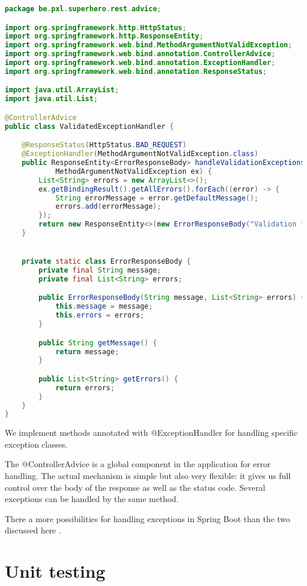 \begin{lstlisting}[language=java, frame=single]
package be.pxl.superhero.rest.advice;

import org.springframework.http.HttpStatus;
import org.springframework.http.ResponseEntity;
import org.springframework.web.bind.MethodArgumentNotValidException;
import org.springframework.web.bind.annotation.ControllerAdvice;
import org.springframework.web.bind.annotation.ExceptionHandler;
import org.springframework.web.bind.annotation.ResponseStatus;

import java.util.ArrayList;
import java.util.List;

@ControllerAdvice
public class ValidatedExceptionHandler {

	@ResponseStatus(HttpStatus.BAD_REQUEST)
	@ExceptionHandler(MethodArgumentNotValidException.class)
	public ResponseEntity<ErrorResponseBody> handleValidationExceptions(
			MethodArgumentNotValidException ex) {
		List<String> errors = new ArrayList<>();
		ex.getBindingResult().getAllErrors().forEach((error) -> {
			String errorMessage = error.getDefaultMessage();
			errors.add(errorMessage);
		});
		return new ResponseEntity<>(new ErrorResponseBody("Validation failed.", errors), HttpStatus.BAD_REQUEST);
	}


	private static class ErrorResponseBody {
		private final String message;
		private final List<String> errors;

		public ErrorResponseBody(String message, List<String> errors) {
			this.message = message;
			this.errors = errors;
		}

		public String getMessage() {
			return message;
		}

		public List<String> getErrors() {
			return errors;
		}
	}
}
\end{lstlisting}

We implement methods annotated with @ExceptionHandler for handling specific exception classes. 

The @ControllerAdvice is a global component in the application for error handling. The actual mechanism is simple but also very flexible: it gives us full control over the body of the response as well as the status code.  Several exceptions can be handled by the same method.

There a more possibilities for handling exceptions in Spring Boot  than the two discussed here \cite{exhand}.

\section{Unit testing}

